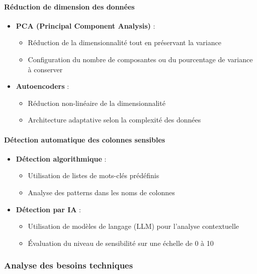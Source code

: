\paragraph{Réduction de dimension des données}
\begin{itemize}
    \item \textbf{PCA (Principal Component Analysis)} :
    \begin{itemize}
        \item Réduction de la dimensionnalité tout en préservant la variance
        \item Configuration du nombre de composantes ou du pourcentage de variance à conserver
    \end{itemize}
    \item \textbf{Autoencoders} :
    \begin{itemize}
        \item Réduction non-linéaire de la dimensionnalité
        \item Architecture adaptative selon la complexité des données
    \end{itemize}
\end{itemize}

\paragraph{Détection automatique des colonnes sensibles}
\begin{itemize}
    \item \textbf{Détection algorithmique} :
    \begin{itemize}
        \item Utilisation de listes de mots-clés prédéfinis
        \item Analyse des patterns dans les noms de colonnes
    \end{itemize}
    \item \textbf{Détection par IA} :
    \begin{itemize}
        \item Utilisation de modèles de langage (LLM) pour l'analyse contextuelle
        \item Évaluation du niveau de sensibilité sur une échelle de 0 à 10
    \end{itemize}
\end{itemize}

\subsubsection{Analyse des besoins techniques}

